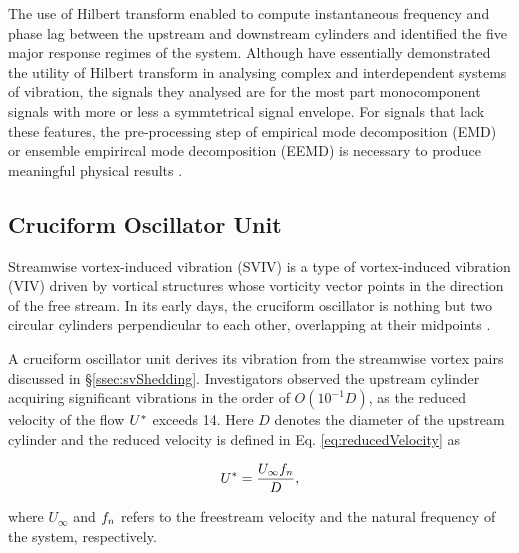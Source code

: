 \documentclass[oneside]{utmthesis}
\begin{document}
The use of Hilbert transform enabled \citet{Yuan2020} to compute instantaneous frequency and phase lag between the upstream and downstream cylinders and identified the five major response regimes of the system. Although \citet{Yuan2020} have essentially demonstrated the utility of Hilbert transform in analysing complex and interdependent systems of vibration, the signals they analysed are for the most part monocomponent signals with more or less a symmtetrical signal envelope. For signals that lack these features, the pre-processing step of empirical mode decomposition (EMD) or ensemble empirircal mode decomposition (EEMD) is necessary to produce meaningful physical results \citep{Huang2014,Chen2019}.

\subsection{Cruciform Oscillator Unit}
Streamwise vortex-induced vibration (SVIV) is a type of vortex-induced vibration (VIV) driven by vortical structures whose vorticity vector points in the direction of the free stream. In its early days, the cruciform oscillator is nothing but two circular cylinders perpendicular to each other, overlapping at their midpoints \citep{Zdravkovich1981,Zdravkovich1983,Zdravkovich1985}.

A cruciform oscillator unit derives its vibration from the streamwise vortex pairs discussed in \S\ref{ssec:svShedding}. Investigators observed the upstream cylinder acquiring significant vibrations in the order of $O(10^{-1}D)$, as the reduced velocity of the flow $U^{*}$ exceeds 14. Here $D$ denotes the diameter of the upstream cylinder and the reduced velocity is defined in Eq. \ref{eq:reducedVelocity} as

\begin{equation}
  U^{*} = \frac{U_{\infty} f_{n}}{D},
  \label{eq:reducedVelocity}
\end{equation}

\noindent where $U_{\infty}$ and $f_{n}$ refers to the freestream velocity and the natural frequency of the system, respectively.
\end{document}

